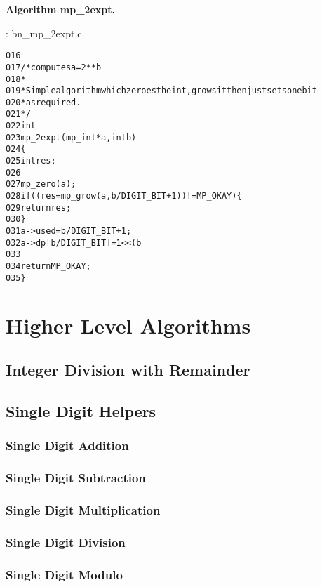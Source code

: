 \documentclass[b5paper]{book}
\begin{document}
\textbf{Algorithm mp\_2expt.}

\vspace{+3mm}\begin{small}
\hspace{-5.1mm}{\bf File}: bn\_mp\_2expt.c
\vspace{-3mm}
\begin{alltt}
016   
017   /* computes a = 2**b 
018    *
019    * Simple algorithm which zeroes the int, grows it then just sets one bit
020    * as required.
021    */
022   int
023   mp_2expt (mp_int * a, int b)
024   \{
025     int     res;
026   
027     mp_zero (a);
028     if ((res = mp_grow (a, b / DIGIT_BIT + 1)) != MP_OKAY) \{
029       return res;
030     \}
031     a->used = b / DIGIT_BIT + 1;
032     a->dp[b / DIGIT_BIT] = 1 << (b % DIGIT_BIT);
033   
034     return MP_OKAY;
035   \}
\end{alltt}
\end{small}


\chapter{Higher Level Algorithms}
\section{Integer Division with Remainder}

\section{Single Digit Helpers}
\subsection{Single Digit Addition}
\subsection{Single Digit Subtraction}
\subsection{Single Digit Multiplication}
\subsection{Single Digit Division}
\subsection{Single Digit Modulo}
\end{document}
